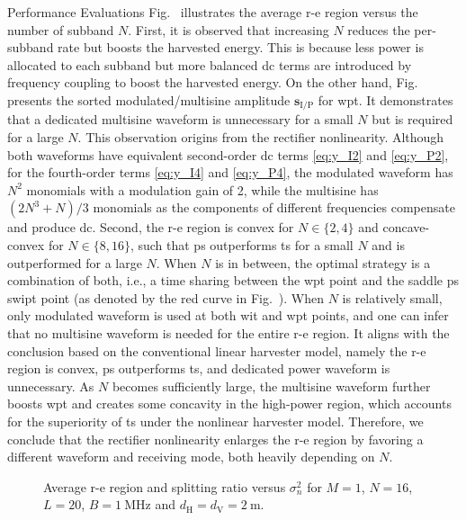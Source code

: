 \begin{section}{Performance Evaluations}
	Fig.~ illustrates the average \gls{r-e} region versus the number of subband $N$. First, it is observed that increasing $N$ reduces the per-subband rate but boosts the harvested energy. This is because less power is allocated to each subband but more balanced \gls{dc} terms are introduced by frequency coupling to boost the harvested energy. On the other hand, Fig.~ presents the sorted modulated/multisine amplitude $\mathbf{s}_{\mathrm{I/P}}$ for \gls{wpt}. It demonstrates that a dedicated multisine waveform is unnecessary for a small $N$ but is required for a large $N$. This observation origins from the rectifier nonlinearity. Although both waveforms have equivalent second-order \gls{dc} terms \eqref{eq:y_I2} and \eqref{eq:y_P2}, for the fourth-order terms \eqref{eq:y_I4} and \eqref{eq:y_P4}, the modulated waveform has $N^2$ monomials with a modulation gain of \num{2}, while the multisine has $(2N^3+N)/3$ monomials as the components of different frequencies compensate and produce \gls{dc}. Second, the \gls{r-e} region is convex for $N \in \{2,4\}$ and concave-convex for $N \in \{8,16\}$, such that \gls{ps} outperforms \gls{ts} for a small $N$ and is outperformed for a large $N$. When $N$ is in between, the optimal strategy is a combination of both, i.e., a time sharing between the \gls{wpt} point and the saddle \gls{ps} \gls{swipt} point (as denoted by the red curve in Fig.~). When $N$ is relatively small, only modulated waveform is used at both \gls{wit} and \gls{wpt} points, and one can infer that no multisine waveform is needed for the entire \gls{r-e} region. It aligns with the conclusion based on the conventional linear harvester model, namely the \gls{r-e} region is convex, \gls{ps} outperforms \gls{ts}, and dedicated power waveform is unnecessary. As $N$ becomes sufficiently large, the multisine waveform further boosts \gls{wpt} and creates some concavity in the high-power region, which accounts for the superiority of \gls{ts} under the nonlinear harvester model. Therefore, we conclude that the rectifier nonlinearity enlarges the \gls{r-e} region by favoring a different waveform and receiving mode, both heavily depending on $N$.

	\begin{figure}[!t]
		\centering
		\caption{Average \gls{r-e} region and splitting ratio versus $\sigma_n^2$ for $M=1$, $N=16$, $L=20$, $B=\qty{1}{\MHz}$ and $d_{\mathrm{H}}=d_{\mathrm{V}}=\qty{2}{\meter}$.}
	\end{figure}


\end{section}
